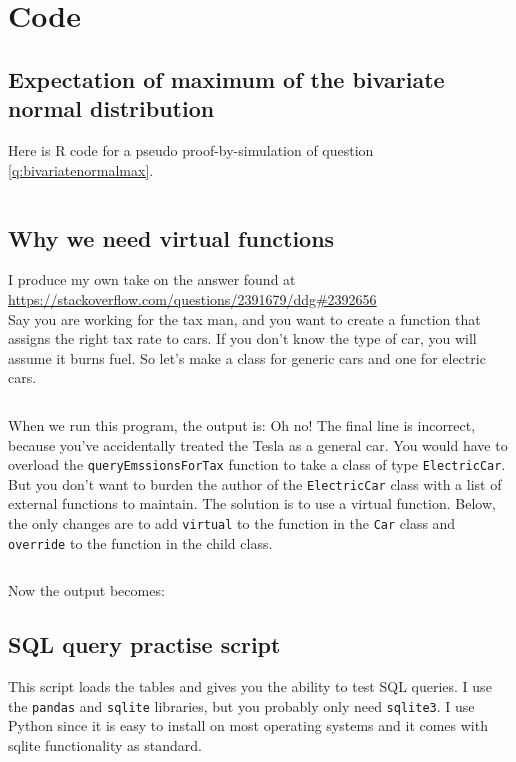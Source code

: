 \documentclass[a4paper]{article}
\begin{document}
\section{Code}
\subsection{Expectation of maximum of the bivariate normal distribution}
\label{ap:mvtnormproof}
Here is R code for a pseudo proof-by-simulation of question \ref{q:bivariatenormalmax}.

\inputminted{r}{./plots/mvtnorm/simtest.R}


\subsection{Why we need virtual functions}
\label{ap:virtualfunctions}
I produce my own take on the answer found at \\
\url{https://stackoverflow.com/questions/2391679/ddg#2392656}\\
Say you are working for the tax man, and you want to create a function that assigns the right tax rate to cars.
If you don't know the type of car, you will assume it burns fuel.
So let's make a class for generic cars and one for electric cars.
\inputminted{cpp}{./plots/virtualfunction/WithoutVirtual.cpp}
When we run this program, the output is:
Oh no! The final line is incorrect, because you've accidentally treated the Tesla as a general car.
You would have to overload the \verb+queryEmssionsForTax+ function to take a
class of type
\verb+ElectricCar+.
But you don't want to burden the author of the
\verb+ElectricCar+
class with a list of external functions to maintain.
The solution is to use a virtual function.
Below, the only changes are to add
\verb+virtual+
to the function in the
\verb+Car+
class and
\verb+override+
to the function in the child class.
\inputminted{cpp}{./plots/virtualfunction/WithVirtual.cpp}
Now the output becomes:

\subsection{SQL query practise script}
\label{ap:sqlite}
This script loads the tables and gives you the ability to test SQL queries.
I use the \verb+pandas+ and \verb+sqlite+ libraries, but you probably only need \verb+sqlite3+.
I use Python since it is easy to install on most operating systems and it comes with sqlite functionality as standard.
\inputminted{python}{./plots/sql/sql.py}
\end{document}
